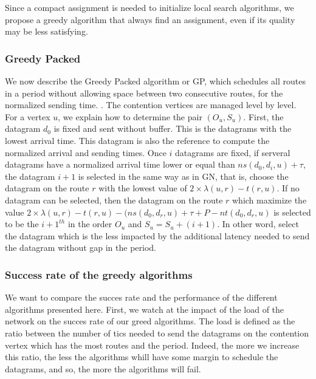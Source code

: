 \documentclass[english]{article}
\begin{document}
Since a compact assignment is needed to initialize local search algorithms, we propose a greedy algorithm that always  find an assignment, even if its quality may be less satisfying.

\subsubsection{Greedy Packed}

We now describe the Greedy Packed algorithm or GP, which schedules all routes in a period without allowing 
space between two consecutive routes, for the normalized sending time.
.
The contention vertices are  managed level by level. For a vertex $u$, we explain how to determine the pair $(O_u,S_u)$. First, the datagram $d_0$ is fixed and sent without buffer. This is the datagrams with the lowest arrival time. This datagram is also the reference to compute the normalized arrival and sending times. Once $i$ datagrams are fixed, if serveral datagrams have a normalized arrival time lower or equal than $ns(d_0,d_i,u)+\tau$, the datagram $i+1$ is selected in the same way as in GN, that is, choose the datagram on the route $r$ with the lowest value of $2\times \lambda(u,r) - t(r,u)$. If no datagram can be selected, then the datagram on the route $r$ which maximize the value $2\times \lambda(u,r) - t(r,u) - (ns(d_0,d_r,u)+\tau+P-nt(d_0,d_r,u)$ is selected to be the $i+1^{th}$ in the order $O_u$ and $S_u = S_u + (i+1)$. In other word, select the datagram which is the less impacted by the additional latency needed to send the datagram without gap in the period.

\subsubsection{Success rate of the greedy algorithms}
We want to compare the succes rate and the performance of the different algorithms presented here.
First, we watch at the impact of the load of the network on the succes rate of our greed algorithms. The load is defined as the ratio between the number of tics needed to send the datagrams on the contention vertex which has the most routes and the period. Indeed, the more we increase this ratio, the less the algorithms whill have some margin to schedule the datagrams, and so, the more the algorithms will fail.
\end{document}
